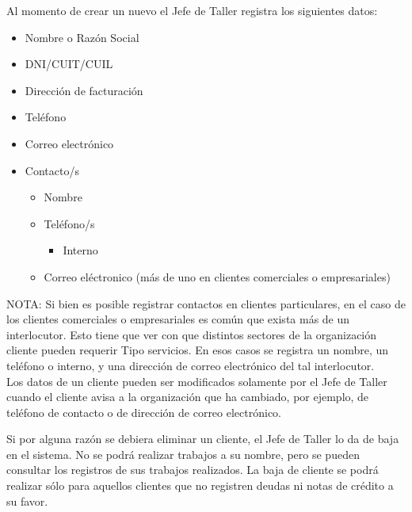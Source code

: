 \documentclass[12pt]{extarticle}
\begin{document}
\begin{spacing}{1.2}
    Al momento de crear un nuevo el Jefe de Taller registra los siguientes datos:
    \begin{itemize}
        \item Nombre o Razón Social
        \item DNI/CUIT/CUIL
        \item Dirección de facturación
        \item Teléfono
        \item Correo electrónico
        \item Contacto/s
        	\begin{itemize}
				\item Nombre	
		        \item Teléfono/s
		        \begin{itemize}
			        \item Interno	        
		        \end{itemize}
		        \item Correo eléctronico (más de uno en clientes comerciales o empresariales)\\        	
        	\end{itemize}
    \end{itemize}

        NOTA: Si bien es posible registrar contactos en clientes particulares, en el caso de los clientes comerciales o empresariales es común que exista más de un interlocutor. Esto tiene que ver con que distintos sectores de la organización cliente pueden requerir Tipo servicios. En esos casos se registra un nombre, un teléfono o interno, y una dirección de correo electrónico del tal interlocutor. \\

    Los datos de un cliente pueden ser modificados solamente por el Jefe de Taller cuando el cliente avisa a la organización que ha cambiado, por ejemplo, de teléfono de contacto o de dirección de correo electrónico.

    Si por alguna razón se debiera eliminar un cliente, el Jefe de Taller lo da de baja en el sistema. No se podrá realizar trabajos a su nombre, pero se pueden consultar los registros de sus trabajos realizados. La baja de cliente se podrá realizar sólo para aquellos clientes que no registren deudas ni notas de crédito a su favor.
    

\end{spacing}
\end{document}
